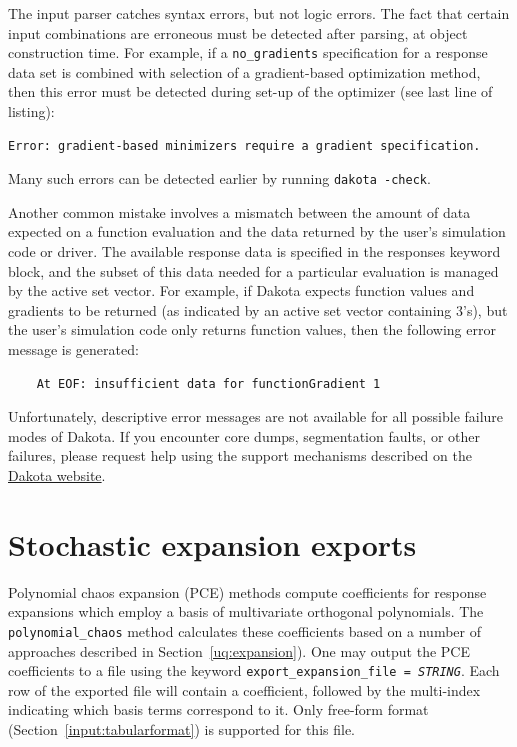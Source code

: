 The input parser catches syntax errors, but not logic errors. The fact
that certain input combinations are erroneous must be detected after
parsing, at object construction time. For example, if a
\texttt{no\_gradients} specification for a response data set is
combined with selection of a gradient-based optimization method, then
this error must be detected during set-up of the optimizer (see last
line of listing):
\begin{small}
\begin{verbatim}
Error: gradient-based minimizers require a gradient specification.
\end{verbatim}
\end{small}
Many such errors can be detected earlier by running \texttt{dakota
  -check}.

Another common mistake involves a mismatch between the amount of data
expected on a function evaluation and the data returned by the user's
simulation code or driver. The available response data is specified in
the responses keyword block, and the subset of this data needed for a
particular evaluation is managed by the active set vector. For
example, if Dakota expects function values and gradients to be
returned (as indicated by an active set vector containing 3's), but
the user's simulation code only returns function values, then the
following error message is generated:
\begin{small}
\begin{verbatim}
    At EOF: insufficient data for functionGradient 1
\end{verbatim}
\end{small}

Unfortunately, descriptive error messages are not available for all
possible failure modes of Dakota. If you encounter core dumps,
segmentation faults, or other failures, please request help using the
support mechanisms described on the
\href{http://dakota.sandia.gov/}{Dakota website}.


\section{Stochastic expansion exports}\label{sec:output:pce}

Polynomial chaos expansion (PCE) methods compute coefficients for
response expansions which employ a basis of multivariate orthogonal
polynomials.  The \texttt{polynomial\_chaos} method calculates these
coefficients based on a number of approaches described in
Section~\ref{uq:expansion}).  One may output the PCE coefficients to a
file using the keyword \texttt{export\_expansion\_file =
  \emph{STRING}}.  Each row of the exported file will contain a
coefficient, followed by the multi-index indicating which basis terms
correspond to it.  Only free-form format
(Section~\ref{input:tabularformat}) is supported for this file.


